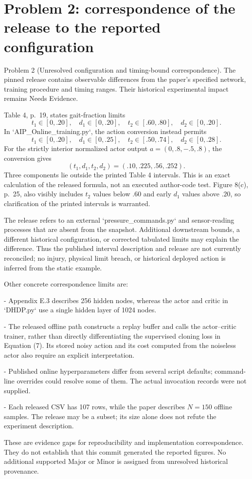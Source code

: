 \documentclass[10pt]{article}
\begin{document}
\section*{Problem 2: correspondence of the release to the reported configuration}
Problem 2 (Unresolved configuration and timing-bound correspondence).  The pinned release contains observable differences from the paper’s specified network, training procedure and timing ranges. Their historical experimental impact remains Needs Evidence.\par
Table 4, p. 19, states gait-fraction limits \[t_1\in[0,.20],\quad d_1\in[0,.20],\quad
 t_2\in[.60,.80],\quad d_2\in[0,.20].\] In `AIP\_Online\_training.py`, the action conversion instead permits \[t_1\in[0,.20],\quad d_1\in[0,.25],\quad
 t_2\in[.50,.74],\quad d_2\in[0,.28].\] For the strictly interior normalized actor output \(a=(0,.8,-.5,.8)\), the conversion gives \[(t_1,d_1,t_2,d_2)=(.10,.225,.56,.252).\] Three components lie outside the printed Table 4 intervals. This is an exact calculation of the released formula, not an executed author-code test. Figure 8(c), p. 25, also visibly includes \(t_2\) values below \(.60\) and early \(d_1\) values above \(.20\), so clarification of the printed intervals is warranted.\par
The release refers to an external `pressure\_commands.py` and sensor-reading processes that are absent from the snapshot. Additional downstream bounds, a different historical configuration, or corrected tabulated limits may explain the difference. Thus the published interval description and release are not currently reconciled; no injury, physical limit breach, or historical deployed action is inferred from the static example.\par
Other concrete correspondence limits are:\par
- Appendix E.3 describes 256 hidden nodes, whereas the actor and critic in `DHDP.py` use a single hidden layer of 1024 nodes.\par
- The released offline path constructs a replay buffer and calls the actor–critic trainer, rather than directly differentiating the supervised cloning loss in Equation (7). Its stored noisy action and its cost computed from the noiseless actor also require an explicit interpretation.\par
- Published online hyperparameters differ from several script defaults; command-line overrides could resolve some of them. The actual invocation records were not supplied.\par
- Each released CSV has 107 rows, while the paper describes \(N=150\) offline samples. The release may be a subset; its size alone does not refute the experiment description.\par
These are evidence gaps for reproducibility and implementation correspondence. They do not establish that this commit generated the reported figures. No additional supported Major or Minor is assigned from unresolved historical provenance.\par
\end{document}
